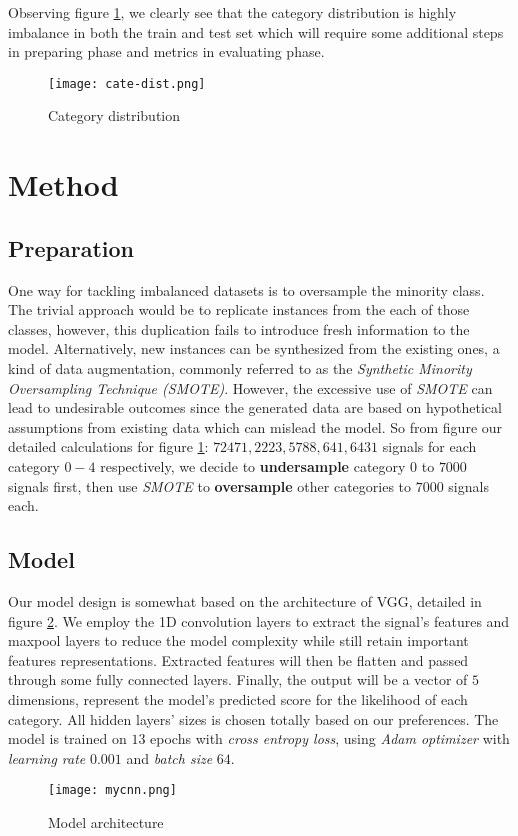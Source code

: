 \documentclass[conference]{IEEEtran}
\begin{document}
Observing figure \ref{fig:catedist}, we clearly see that the category distribution is highly imbalance in both the train and test set which will require some additional steps in preparing phase and metrics in evaluating phase.
\begin{figure}[h]
    \texttt{[image: cate-dist.png]}
    \caption{Category distribution}
    \label{fig:catedist}
\end{figure}

\section{Method}
\subsection{Preparation}
One way for tackling imbalanced datasets is to oversample the minority class. The trivial approach would be to replicate instances from the each of those classes, however, this duplication fails to introduce fresh information to the model. Alternatively, new instances can be synthesized from the existing ones, a kind of data augmentation, commonly referred to as the \emph{Synthetic Minority Oversampling Technique (SMOTE)}\cite{Chawla2002}. However, the excessive use of \emph{SMOTE} can lead to undesirable outcomes since the generated data are based on hypothetical assumptions from existing data which can mislead the model. So from figure our detailed calculations for figure \ref{fig:catedist}: $72471, 2223, 5788, 641, 6431$ signals for each category $0-4$ respectively, we decide to \textbf{undersample} category $0$ to $7000$ signals first, then use \emph{SMOTE} to \textbf{oversample} other categories to $7000$ signals each. 

\subsection{Model}
Our model design is somewhat based on the architecture of VGG\cite{Simonyan2015}, detailed in figure \ref{fig:mycnn}. We employ the 1D convolution layers to extract the signal's features and maxpool layers to reduce the model complexity while still retain important features representations. Extracted features will then be flatten and passed through some fully connected layers. Finally, the output will be a vector of $5$ dimensions, represent the model's predicted score for the likelihood of each category. All hidden layers' sizes is chosen totally based on our preferences. The model is trained on $13$ epochs with \emph{cross entropy loss}, using \emph{Adam optimizer} with \emph{learning rate} $0.001$ and \emph{batch size} $64$.
\begin{figure}[h]
    \texttt{[image: mycnn.png]}
    \caption{Model architecture}
    \label{fig:mycnn}
\end{figure}
\end{document}
